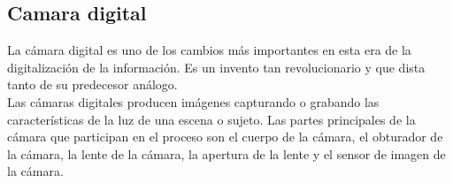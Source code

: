 \subsection{Camara digital}
La cámara digital es uno de los cambios más importantes en esta era de la digitalización
de la información. Es un invento tan revolucionario y que dista tanto de su predecesor
análogo.\\
Las cámaras digitales producen imágenes capturando o grabando las características de
la luz de una escena o sujeto. Las partes principales de la cámara que participan en
el proceso son el cuerpo de la cámara, el obturador de la cámara, la lente de la cámara,
la apertura de la lente y el sensor de imagen de la cámara. \cite{WEB:CameraWorks}

